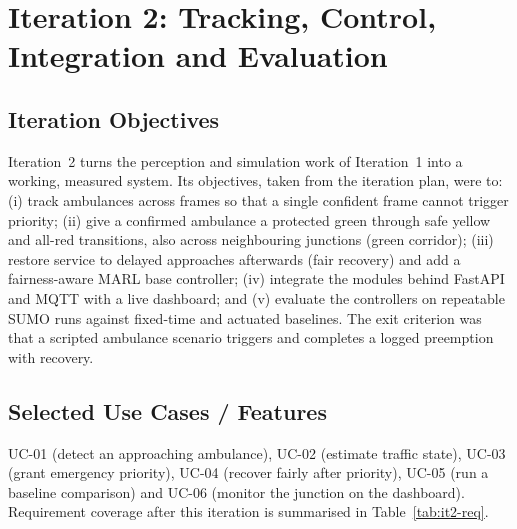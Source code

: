 
\chapter{Iteration 2: Tracking, Control, Integration and Evaluation}
\label{ch:iteration2}

\section{Iteration Objectives}
Iteration~2 turns the perception and simulation work of Iteration~1 into a working, measured system.
Its objectives, taken from the iteration plan, were to:
(i) track ambulances across frames so that a single confident frame cannot trigger priority;
(ii) give a confirmed ambulance a protected green through safe yellow and all-red transitions, also across
neighbouring junctions (green corridor);
(iii) restore service to delayed approaches afterwards (fair recovery) and add a fairness-aware MARL base
controller;
(iv) integrate the modules behind FastAPI and MQTT with a live dashboard; and
(v) evaluate the controllers on repeatable SUMO runs against fixed-time and actuated baselines.
The exit criterion was that a scripted ambulance scenario triggers and completes a logged preemption with
recovery.

\section{Selected Use Cases / Features}
UC-01 (detect an approaching ambulance), UC-02 (estimate traffic state), UC-03 (grant emergency priority),
UC-04 (recover fairly after priority), UC-05 (run a baseline comparison) and UC-06 (monitor the junction on
the dashboard). Requirement coverage after this iteration is summarised in Table~\ref{tab:it2-req}.

